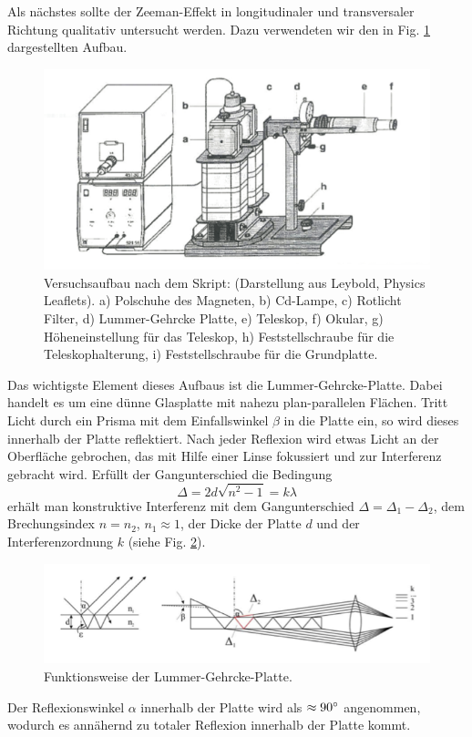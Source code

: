 Als nächstes sollte der Zeeman-Effekt in longitudinaler und transversaler Richtung qualitativ untersucht werden. Dazu verwendeten wir den in Fig. \ref{fig:Aufbau} dargestellten Aufbau.
\begin{figure}
  \includegraphics[width=\linewidth]{images/Aufbau.png}
  \caption{\cite{Skript} Versuchsaufbau nach dem Skript: (Darstellung aus Leybold, Physics Leaflets). a) Polschuhe des Magneten, b) Cd-Lampe, c) Rotlicht Filter, d) Lummer-Gehrcke Platte, e) Teleskop, f) Okular, g) Höheneinstellung für das Teleskop, h) Feststellschraube für die Teleskophalterung, i) Feststellschraube für die Grundplatte.}
  \label{fig:Aufbau}
\end{figure}

Das wichtigste Element dieses Aufbaus ist die Lummer-Gehrcke-Platte. Dabei handelt es um eine dünne Glasplatte mit nahezu plan-parallelen Flächen. Tritt Licht durch ein Prisma mit dem Einfallswinkel $\beta$ in die Platte ein, so wird dieses innerhalb der Platte reflektiert. Nach jeder Reflexion wird etwas Licht an der Oberfläche gebrochen, das mit Hilfe einer Linse fokussiert und zur Interferenz gebracht wird. Erfüllt der Gangunterschied die Bedingung
 \begin{equation} \label{eq:11}
\Delta = 2d\sqrt{n^2-1} = k \lambda
\end{equation}
erhält man konstruktive Interferenz mit dem Gangunterschied $\Delta = \Delta_1 - \Delta_2$, dem Brechungsindex $n = n_2$, $n_1 \approx 1$, der Dicke der Platte $d$ und der Interferenzordnung $k$ (siehe Fig. \ref{fig:LG}).
\begin{figure}
  \includegraphics[width=\linewidth]{images/LGPlatte.png}
  \caption{\cite{Skript2} Funktionsweise der Lummer-Gehrcke-Platte.}
  \label{fig:LG}
\end{figure}
Der Reflexionswinkel $\alpha$ innerhalb der Platte wird als $\approx 90 \degree$ angenommen, wodurch es annähernd zu totaler Reflexion innerhalb der Platte kommt.


